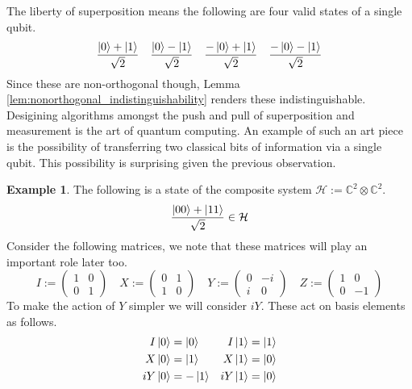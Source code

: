\documentclass[12pt]{article}
\theoremstyle{plain}
\theoremstyle{definition}
\newtheorem{example}[thm]{Example}
\newcommand{\bb}[1]{\mathbb{#1}}
\newcommand{\call}[1]{\mathcal{#1}}
\begin{document}
The liberty of superposition means the following are four valid states of a single qubit.
\begin{equation}
	\frac{\ket{0} + \ket{1}}{\sqrt{2}}\quad \frac{\ket{0} - \ket{1}}{\sqrt{2}}\quad  \frac{-\ket{0} + \ket{1}}{\sqrt{2}} \quad \frac{-\ket{0} - \ket{1}}{\sqrt{2}}
	\end{equation}
Since these are non-orthogonal though, Lemma \ref{lem:nonorthogonal_indistinguishability} renders these indistinguishable. Desigining algorithms amongst the push and pull of superposition and measurement is the art of quantum computing. An example of such an art piece is the possibility of transferring two classical bits of information via a single qubit. This possibility is surprising given the previous observation.

	\begin{example}\label{ex:2_bits}
		The following is a state of the composite system $\call{H} := \bb{C}^2 \otimes \bb{C}^2$.
		\begin{equation}\label{eq:bell}
			\frac{\ket{00} + \ket{11}}{\sqrt{2}} \in \call{H}
		\end{equation}
		Consider the following matrices, we note that these matrices will play an important role later too.
		\begin{equation}\label{eq:pauli}
			I :=
			\begin{pmatrix}
				1 & 0\\
				0 & 1
			\end{pmatrix}
			\quad
			X :=
			\begin{pmatrix}
				0 &1\\
				1 &0
			\end{pmatrix}
			\quad
			Y :=
			\begin{pmatrix}
				0 & -i\\
				i & 0
			\end{pmatrix}
			\quad
			Z :=
			\begin{pmatrix}
				1 & 0\\
				0 & -1
			\end{pmatrix}
		\end{equation}
		To make the action of $Y$ simpler we will consider $iY$. These act on basis elements as follows.
		\begin{align*}
			I\ket{0} &= \ket{0} & I\ket{1} &= \ket{1}\\
			X\ket{0} &= \ket{1} & X\ket{1} &= \ket{0}\\
			iY\ket{0} &= -\ket{1} & iY \ket{1} &= \ket{0}\\

\end{align*}
\end{example}
\end{document}

